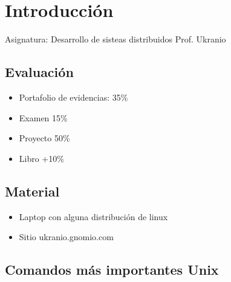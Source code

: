 \chapter{Introducción}
Asignatura: Desarrollo de sisteas distribuidos
Prof. Ukranio

\section{Evaluación}

\begin{itemize}
    \item {Portafolio de evidencias: 35\%}
    \item {Examen 15\%}
    \item {Proyecto 50\%}
    \item {Libro +10\%}
\end{itemize}

\section{Material}
\begin{itemize}
    \item {Laptop con alguna distribución de linux}
    \item {Sitio ukranio.gnomio.com}
\end{itemize}

\section{Comandos más importantes Unix}

